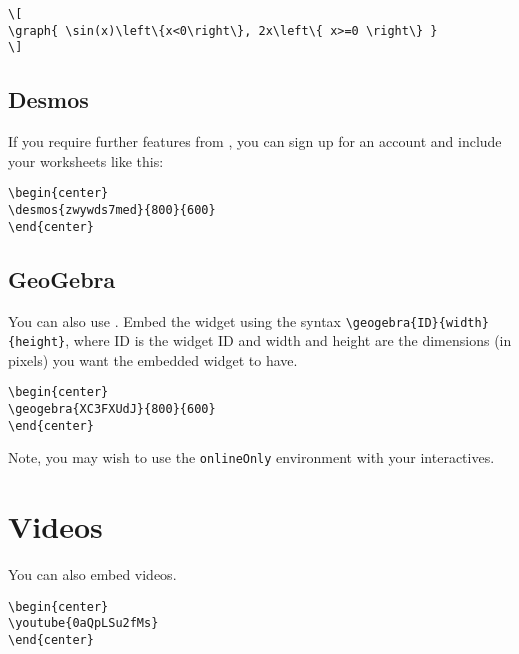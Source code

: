 \documentclass{ximera}
\begin{document}
\begin{verbatim}
\[
\graph{ \sin(x)\left\{x<0\right\}, 2x\left\{ x>=0 \right\} }
\]
\end{verbatim}


\subsection{Desmos}

If you require further features from
, you can sign up for an account
and include your worksheets like this:

\begin{verbatim}
\begin{center}
\desmos{zwywds7med}{800}{600}
\end{center}
\end{verbatim}
\begin{center}
\end{center}


\subsection{GeoGebra}

You can also use . Embed the
widget using the syntax \verb|\geogebra{ID}{width}{height}|, where ID
is the widget ID and width and height are the dimensions (in pixels)
you want the embedded widget to have.
\begin{center}
\end{center}



\begin{verbatim}
\begin{center}
\geogebra{XC3FXUdJ}{800}{600}
\end{center}
\end{verbatim}

Note, you may wish to use the \verb|onlineOnly| environment with your
interactives.

\section{Videos}

You can also embed  videos.
\begin{center}
\end{center}

\begin{verbatim}
\begin{center}
\youtube{0aQpLSu2fMs}
\end{center}
\end{verbatim}
\end{document}
